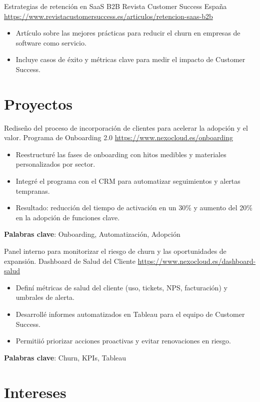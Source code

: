 \documentclass[a4paper, serif, 10pt]{moderncv}
\begin{document}
        {Estrategias de retención en SaaS B2B}
        {Revista Customer Success España}
        {\url{https://www.revistacustomersuccess.es/articulos/retencion-saas-b2b}}
        {}
        {\begin{itemize}
\item Artículo sobre las mejores prácticas para reducir el churn en empresas de software como servicio.
\item Incluye casos de éxito y métricas clave para medir el impacto de Customer Success.
\end{itemize}}
\section{Proyectos}

        {Rediseño del proceso de incorporación de clientes para acelerar la adopción y el valor.}
        {Programa de Onboarding 2.0}
        {\url{https://www.nexocloud.es/onboarding}}
        {}
        {\begin{itemize}
\item Reestructuré las fases de onboarding con hitos medibles y materiales personalizados por sector.
\item Integré el programa con el CRM para automatizar seguimientos y alertas tempranas.
\item Resultado: reducción del tiempo de activación en un 30\% y aumento del 20\% en la adopción de funciones clave.
\end{itemize}
\textbf{Palabras clave}: Onboarding, Automatización, Adopción}

        {Panel interno para monitorizar el riesgo de churn y las oportunidades de expansión.}
        {Dashboard de Salud del Cliente}
        {\url{https://www.nexocloud.es/dashboard-salud}}
        {}
        {\begin{itemize}
\item Definí métricas de salud del cliente (uso, tickets, NPS, facturación) y umbrales de alerta.
\item Desarrollé informes automatizados en Tableau para el equipo de Customer Success.
\item Permitiió priorizar acciones proactivas y evitar renovaciones en riesgo.
\end{itemize}
\textbf{Palabras clave}: Churn, KPIs, Tableau}
\section{Intereses}
\end{document}
